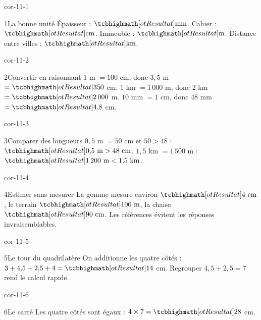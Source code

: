 \clearpage\pagestyle{otMain}\setlength{\otBlocEspacement}{2.5mm}\fontsize{11}{15}\selectfont{}
\begin{blocLivre}{cor-11-1}\begin{corrige}{1}{La bonne unité}
Épaisseur : $\res{\text{mm}}$. Cahier : $\res{\text{cm}}$. Immeuble : $\res{\text m}$. Distance entre villes : $\res{\text{km}}$.
\end{corrige}\end{blocLivre}
\begin{blocLivre}{cor-11-2}\begin{corrige}{2}{Convertir en raisonnant}
$1$ m $=100$ cm, donc $3{,}5$ m $=\res{350}$ cm. $1$ km $=1\,000$ m, donc 2 km $=\res{2\,000}$ m. $10$ mm $=1$ cm, donc 48 mm $=\res{4{,}8}$ cm.
\end{corrige}\end{blocLivre}
\begin{blocLivre}{cor-11-3}\begin{corrige}{3}{Comparer des longueurs}
$0{,}5$ m $=50$ cm et $50>48$ : $\res{0{,}5\ \mathrm m>48\ \mathrm{cm}}$. $1{,}5$ km $=1\,500$ m : $\res{1\,200\ \mathrm m<1{,}5\ \mathrm{km}}$.
\end{corrige}\end{blocLivre}
\begin{blocLivre}{cor-11-4}\begin{corrige}{4}{Estimer sans mesurer}
La gomme mesure environ $\res{4\ \mathrm{cm}}$, le terrain $\res{100\ \mathrm m}$, la chaise $\res{90\ \mathrm{cm}}$. Les références évitent les réponses invraisemblables.
\end{corrige}\end{blocLivre}
\begin{blocLivre}{cor-11-5}\begin{corrige}{5}{Le tour du quadrilatère}
On additionne les quatre côtés : $3+4{,}5+2{,}5+4=\res{14}$ cm. Regrouper $4{,}5+2{,}5=7$ rend le calcul rapide.
\label{fig-cor-11-5}
\end{corrige}\end{blocLivre}
\begin{blocLivre}{cor-11-6}\begin{corrige}{6}{Le carré}
Les quatre côtés sont égaux : $4\times7=\res{28}$ cm.
\label{fig-cor-11-6}
\end{corrige}\end{blocLivre}
